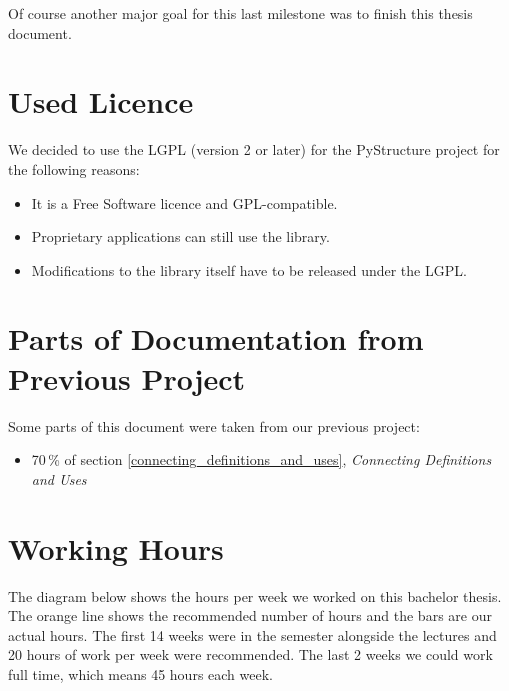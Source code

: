 \documentclass[12pt,halfparskip,DIV11,BCOR10mm]{scrreprt}
\begin{document}
Of course another major goal for this last milestone was to finish this thesis document.

\section{Used Licence}

We decided to use the LGPL (version 2 or later) for the PyStructure project for the following reasons:

\begin{itemize}
    \item It is a Free Software licence and GPL-compatible.
    \item Proprietary applications can still use the library.
    \item Modifications to the library itself have to be released under the LGPL.
\end{itemize}

\section{Parts of Documentation from Previous Project}

Some parts of this document were taken from our previous project:

\begin{itemize}
    \item 70\,\% of section \vref{connecting_definitions_and_uses}, \emph{Connecting Definitions and Uses}
\end{itemize}

\section{Working Hours}

The diagram below shows the hours per week we worked on this bachelor thesis. The orange line shows the recommended number of hours and the bars are our actual hours. The first 14 weeks were in the semester alongside the lectures and 20 hours of work per week were recommended. The last 2 weeks we could work full time, which means 45 hours each week.
\end{document}
